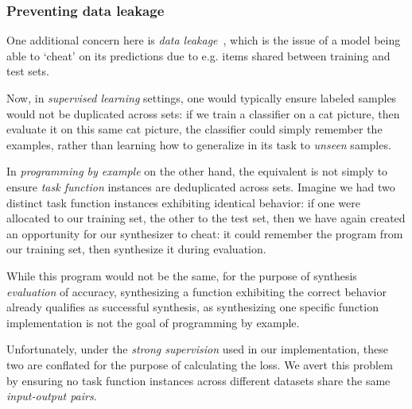\documentclass{article}
\begin{document}
\subsubsection{Preventing data leakage}

One additional concern here is \emph{data leakage}~\citep{leakage},
which is the issue of a model being able to `cheat' on its predictions due to e.g. items shared between training and test sets.

Now, in \emph{supervised learning} settings,
one would typically ensure labeled samples would not be duplicated across sets:
if we train a classifier on a cat picture,
then evaluate it on this same cat picture,
the classifier could simply remember the examples,
rather than learning how to generalize in its task to \emph{unseen} samples.

In \emph{programming by example} on the other hand,
the equivalent is not simply to ensure \emph{task function} instances are deduplicated across sets.
Imagine we had two distinct task function instances exhibiting identical behavior:
if one were allocated to our training set, the other to the test set,
then we have again created an opportunity for our synthesizer to cheat:
it could remember the program from our training set,
then synthesize it during evaluation.

While this program would not be the same,
for the purpose of synthesis \emph{evaluation} of accuracy,
synthesizing a function exhibiting the correct behavior already qualifies as successful synthesis,
as synthesizing one specific function implementation is not the goal of programming by example.

    Unfortunately, under the \emph{strong supervision} used in our implementation,
    these two are conflated for the purpose of calculating the loss.
We avert this problem by ensuring no task function instances across different datasets share the same \emph{input-output pairs}.



\end{document}
